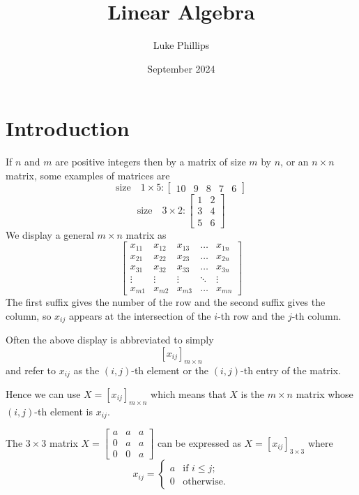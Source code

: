 \documentclass[10pt, a4paper]{article}
\title{Linear Algebra}
\author{Luke Phillips}
\date{September 2024}
\begin{document}
\maketitle

\section{Introduction}

If $n$ and $m$ are positive integers then by a matrix of size $m$ by $n$, or an $n \times n$ matrix, some examples of matrices are
\[
\text{size}\quad 1\times 5 : \begin{bmatrix} 10 & 9 & 8 & 7 & 6 \end{bmatrix}
\]
\[
\text{size}\quad 3\times 2 : \begin{bmatrix} 1 & 2 \\ 3 & 4 \\ 5 & 6 \end{bmatrix}
\]
We display a general $m \times n$ matrix as
\[
\begin{bmatrix}
    x_{11} & x_{12} & x_{13} & \dots & x_{1n} \\
    x_{21} & x_{22} & x_{23} & \dots & x_{2n} \\
    x_{31} & x_{32} & x_{33} & \dots & x_{3n} \\
    \vdots & \vdots & \vdots & \ddots & \vdots \\
    x_{m1} & x_{m2} & x_{m3} & \dots & x_{mn}
\end{bmatrix}
\]
The first suffix gives the number of the row and the second suffix gives the column, so $x_{ij}$ appears at the intersection of the $i$-th row and the $j$-th column. 

Often the above display is abbreviated to simply
\[
[x_{ij}]_{m\times n}
\]
and refer to $x_{ij}$ as the $(i, j)$-th element or the $(i, j)$-th entry of the matrix.

Hence we can use $X = [x_{ij}]_{m\times n}$ which means that $X$ is the $m\times n$ matrix whose $(i, j)$-th element is $x_{ij}$.

\begin{example}
    The $3\times 3$ matrix $X = \begin{bmatrix} a & a & a \\ 0 & a & a \\ 0 & 0 & a \end{bmatrix}$ can be expressed as $X = [x_{ij}]_{3\times 3}$ where
    \[
    x_{ij} = 
    \begin{cases}
        a & \text{if } i \leq j; \\
        0 & \text{otherwise}.
    \end{cases}
    \]
\end{example}
\end{document}
